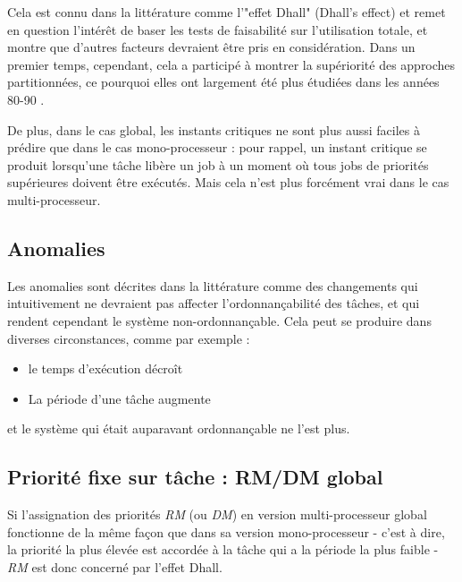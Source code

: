 \documentclass[11pt,a4paper,oneside]{report}
\begin{document}
	Cela est connu dans la littérature comme l'"effet Dhall" (Dhall's effect) et remet en 
	question l'intérêt de baser les tests de faisabilité sur l'utilisation totale, et 
	montre que d'autres facteurs devraient être pris en considération. Dans un premier temps, cependant, 
	cela a participé à montrer la supériorité des approches partitionnées, ce pourquoi elles ont 
	largement été plus étudiées dans les années 80-90 \cite{davis_survey_2011}.\medskip
	
	De plus, dans le cas global, les instants critiques ne sont plus aussi faciles à prédire 
	que dans le cas mono-processeur : pour rappel, un instant critique se produit lorsqu'une tâche 
	libère un job à un moment où tous jobs de priorités supérieures doivent être exécutés. 
	Mais cela n'est plus forcément vrai dans le cas multi-processeur.\medskip
	
	
	\subsection{Anomalies}
	Les anomalies sont décrites dans la littérature comme des changements qui intuitivement ne devraient 
	pas affecter l'ordonnançabilité des tâches, et qui rendent cependant le système non-ordonnançable. 
	Cela peut se produire dans diverses circonstances, comme par exemple :\medskip
	\begin{itemize}
		\item le temps d'exécution décroît
		\item La période d'une tâche augmente
	\end{itemize}
	et le système qui était auparavant ordonnançable ne l'est plus.
	
	
	
	\subsection{Priorité fixe sur tâche : RM/DM global}
	Si l'assignation des priorités \textit{RM} (ou \textit{DM}) en version multi-processeur global 
	fonctionne de la même façon que dans sa version mono-processeur - 
	c'est à dire, la priorité la plus élevée est accordée à la tâche qui a la période la plus faible - 
	\textit{RM} est donc concerné par l'effet Dhall. \medskip
	
	
\end{document}
